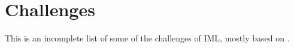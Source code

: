 \documentclass[runningheads]{llncs}
\begin{document}
%


\section{Challenges}

This is an incomplete list of some of the challenges of IML, mostly based on \cite{molnar2020pitfalls}.
\end{document}
